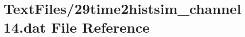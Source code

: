 \hypertarget{29time2histsim__channel14_8dat}{}\section{Text\+Files/29time2histsim\+\_\+channel14.dat File Reference}
\label{29time2histsim__channel14_8dat}

